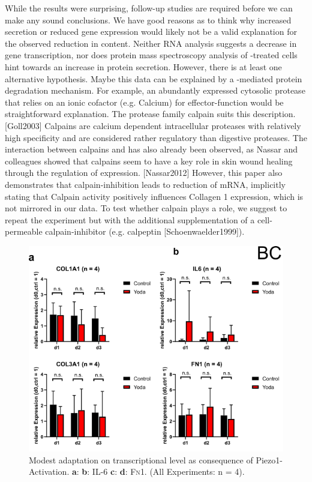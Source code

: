 While the results were surprising, follow-up studies are required before we can make any sound conclusions. We have good reasons as to think why increased secretion or reduced gene expression would likely not be a valid explanation for the observed reduction in \colone{} content. Neither RNA analysis suggests a decrease in gene transcription, nor does protein mass spectroscopy analysis of \Yoda{}-treated cells hint towards an increase in protein secretion. However, there is at least one alternative hypothesis. Maybe this data can be explained by a \Piezo{}-mediated protein degradation mechanism. For example, an abundantly expressed cytosolic protease that relies on an ionic cofactor (e.g. Calcium) for effector-function would be straightforward explanation. The protease family calpain suits this description. [Goll2003] Calpains are calcium dependent intracellular proteases with relatively high specificity and are considered rather regulatory than digestive proteases. The interaction between calpains and \colone has also already been observed, as Nassar and colleagues showed that calpains seem to have a key role in skin wound healing through the regulation of \colone{} expression. [Nassar2012] However, this paper also demonstrates that calpain-inhibition leads to reduction of \colone{} mRNA, implicitly stating that Calpain activity positively influences Collagen 1 expression, which is not mirrored in our data. To test whether calpain plays a role, we suggest to repeat the experiment but with the additional supplementation of a cell-permeable calpain-inhibitor (e.g. calpeptin [Schoenwaelder1999]).


\begin{figure}[ht]
    \centering
    \includegraphics[scale = 0.6]{Collection.png}
    \caption{
    Modest adaptation on transcriptional level as consequence of Piezo1-Activation. \hfill \newline
    \textbf{a}: \colone{}
    \textbf{b}: IL-6
    \textbf{c}: \colthree{}
    \textbf{d}: \textsc{Fn}1. 
    (All Experiments: n = 4). 
    }
    \label{fig:my_label}
\end{figure}


